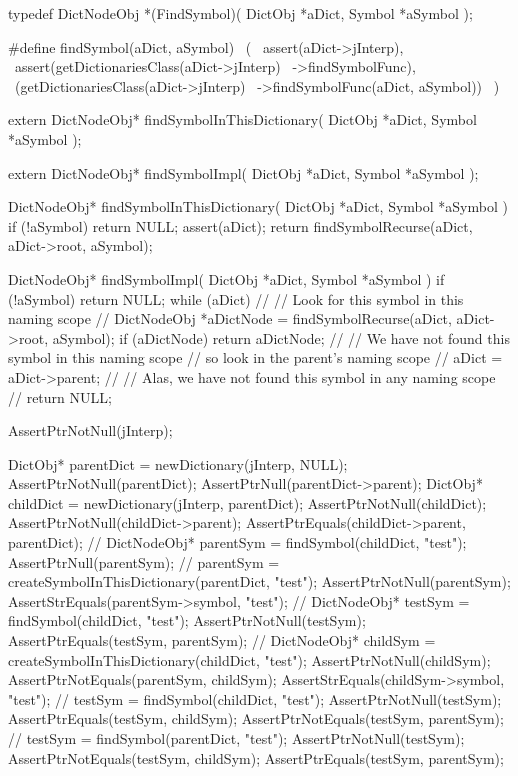 \startTestSuite[findSymbol]

\startCHeader
typedef DictNodeObj *(FindSymbol)(
  DictObj *aDict,
  Symbol  *aSymbol
);

#define findSymbol(aDict, aSymbol)              \
  (                                             \
    assert(aDict->jInterp),                     \
    assert(getDictionariesClass(aDict->jInterp) \
      ->findSymbolFunc),                        \
    (getDictionariesClass(aDict->jInterp)       \
      ->findSymbolFunc(aDict, aSymbol))         \
  )
\stopCHeader

\setCHeaderStream{private}
\startCHeader
extern DictNodeObj* findSymbolInThisDictionary(
  DictObj *aDict,
  Symbol  *aSymbol
);

extern DictNodeObj* findSymbolImpl(
  DictObj *aDict,
  Symbol  *aSymbol
);
\stopCHeader
{}

\startCCode
DictNodeObj* findSymbolInThisDictionary(
  DictObj *aDict,
  Symbol  *aSymbol
) {
  if (!aSymbol) return NULL;
  assert(aDict);
  return findSymbolRecurse(aDict, aDict->root, aSymbol);
}

DictNodeObj* findSymbolImpl(
  DictObj *aDict,
  Symbol  *aSymbol
) {
  if (!aSymbol) return NULL;
  while (aDict) {
    //
    // Look for this symbol in this naming scope
    //
    DictNodeObj *aDictNode = 
      findSymbolRecurse(aDict, aDict->root, aSymbol);
    if (aDictNode) return aDictNode;
    //
    // We have not found this symbol in this naming scope
    // so look in the parent's naming scope
    //
    aDict = aDict->parent;
  }
  //
  // Alas, we have not found this symbol in any naming scope
  //
  return NULL;
}
\stopCCode

\startTestCase[should find symbols in parent dictionary]
\startCTest
  AssertPtrNotNull(jInterp);

  DictObj* parentDict = newDictionary(jInterp, NULL);
  AssertPtrNotNull(parentDict);
  AssertPtrNull(parentDict->parent);
  DictObj* childDict  = newDictionary(jInterp, parentDict);
  AssertPtrNotNull(childDict);
  AssertPtrNotNull(childDict->parent);
  AssertPtrEquals(childDict->parent, parentDict);
  //
  DictNodeObj* parentSym = findSymbol(childDict, "test");
  AssertPtrNull(parentSym);
  //
  parentSym = 
    createSymbolInThisDictionary(parentDict, "test");
  AssertPtrNotNull(parentSym);
  AssertStrEquals(parentSym->symbol, "test");
  //
  DictNodeObj* testSym = findSymbol(childDict, "test");
  AssertPtrNotNull(testSym);
  AssertPtrEquals(testSym, parentSym);
  //
  DictNodeObj* childSym =
    createSymbolInThisDictionary(childDict, "test");
  AssertPtrNotNull(childSym);
  AssertPtrNotEquals(parentSym, childSym);
  AssertStrEquals(childSym->symbol, "test");
  //
  testSym = findSymbol(childDict, "test");
  AssertPtrNotNull(testSym);
  AssertPtrEquals(testSym, childSym);
  AssertPtrNotEquals(testSym, parentSym);
  //
  testSym = findSymbol(parentDict, "test");
  AssertPtrNotNull(testSym);
  AssertPtrNotEquals(testSym, childSym);
  AssertPtrEquals(testSym, parentSym);
\stopCTest
\stopTestCase
\stopTestSuite

